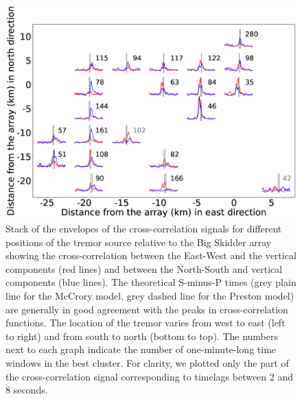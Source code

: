 \documentclass[draft]{agujournal2019}
\begin{document}
\begin{figure}
\noindent\includegraphics[width=\textwidth, trim={2.5cm 0.5cm 5cm 1cm},clip]{figures/BS_PWS_PWS_0.eps}
\caption{Stack of the envelopes of the cross-correlation signals for different positions of the tremor source relative to the Big Skidder array showing the cross-correlation between the East-West and the vertical components (red lines) and between the North-South and vertical components (blue lines). The theoretical S-minus-P times (grey plain line for the McCrory model, grey dashed line for the Preston model) are generally in good agreement with the peaks in cross-correlation functions. The location of the tremor varies from west to east (left to right) and from south to north (bottom to top). The numbers next to each graph indicate the number of one-minute-long time windows in the best cluster. For clarity, we plotted only the part of the cross-correlation signal corresponding to timelags between 2 and 8 seconds.}
\label{pngfiguresample}
\end{figure}
\end{document}
